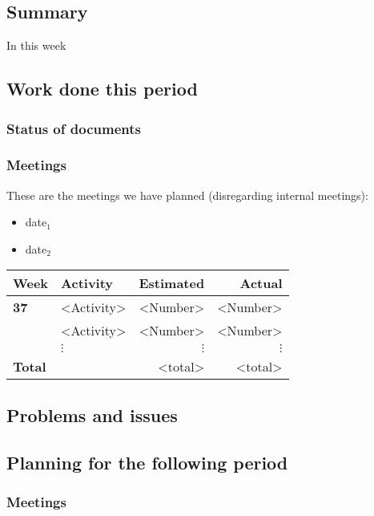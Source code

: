 \subsection{Summary}
In this week
\subsection{Work done this period}
\subsubsection{Status of documents}
\subsubsection{Meetings}
These are the meetings we have planned (disregarding internal meetings):\\
\begin{itemize}
\item date$_1$
\item date$_2$
\end{itemize}
  \begin{tabular}{| l | l | r | r |}
    \hline
    \textbf{Week} & \textbf{Activity} & \textbf{Estimated} & \textbf{Actual}\\ \hline
    \textbf{37} & <Activity> & <Number> & <Number> \\ \hline
     & <Activity> & <Number> & <Number> \\ \hline
     & $\vdots$ & $\vdots$ & $\vdots$ \\ \hline
     \textbf{Total }&  & <total> & <total> \\
    \hline
  \end{tabular}

\subsection{Problems and issues}

\subsection{Planning for the following period}
\subsubsection{Meetings}
\newpage
